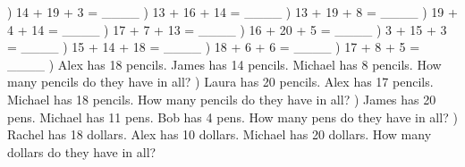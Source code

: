 \documentclass{article}%
\begin{document}
) 14 + 19 + 3 = \_\_\_\_%
\newline%
\newline%
) 13 + 16 + 14 = \_\_\_\_%
\newline%
\newline%
) 13 + 19 + 8 = \_\_\_\_%
\newline%
\newline%
) 19 + 4 + 14 = \_\_\_\_%
\newline%
\newline%
) 17 + 7 + 13 = \_\_\_\_%
\newline%
\newline%
) 16 + 20 + 5 = \_\_\_\_%
\newline%
\newline%
) 3 + 15 + 3 = \_\_\_\_%
\newline%
\newline%
) 15 + 14 + 18 = \_\_\_\_%
\newline%
\newline%
) 18 + 6 + 6 = \_\_\_\_%
\newline%
\newline%
) 17 + 8 + 5 = \_\_\_\_%
\newline%
\newline%
) Alex has 18 pencils. James has 14 pencils. Michael has 8 pencils. How many pencils do they have in all?%
\newline%
\newline%
) Laura has 20 pencils. Alex has 17 pencils. Michael has 18 pencils. How many pencils do they have in all?%
\newline%
\newline%
) James has 20 pens. Michael has 11 pens. Bob has 4 pens. How many pens do they have in all?%
\newline%
\newline%
) Rachel has 18 dollars. Alex has 10 dollars. Michael has 20 dollars. How many dollars do they have in all?%
\end{document}

